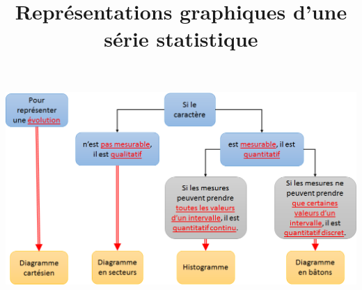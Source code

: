 \documentclass[12pt,a4paper]{article}
\date{}
\title{Représentations graphiques d'une série statistique }
\begin{document}


%	
%	
%	
%
%	
%	
%	
%
%
%			
%
%		
%			
%			
%	















\begin{center}
	\includegraphics[scale=0.78]{img/bilan}
\end{center}
\end{document}

